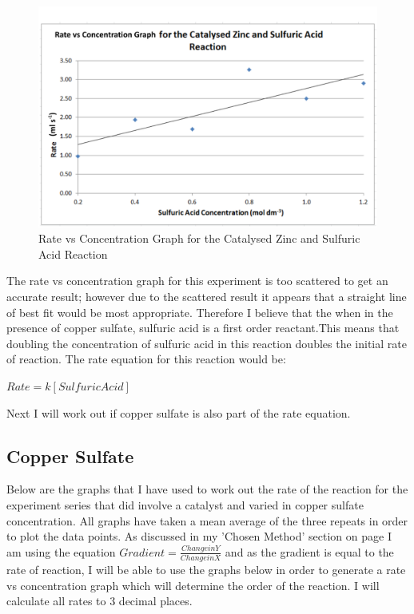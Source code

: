 \begin{figure}[H]
    \includegraphics[width=\textwidth]{./Analysis/Images/2Catalysed/ProgressGraph.pdf}
    \caption{Rate vs Concentration Graph for the Catalysed Zinc and Sulfuric Acid Reaction} \label{fig:ProgressGraphSACS}
\end{figure}

The rate vs concentration graph for this experiment is too scattered to get an accurate result; however due to the scattered result it appears that a straight line of best fit would be most appropriate. Therefore I believe that the when in the presence of copper sulfate, sulfuric acid is a first order reactant.This means that doubling the concentration of sulfuric acid in this reaction doubles the initial rate of reaction. The rate equation for this reaction would be:

$Rate = k [Sulfuric Acid]$

Next I will work out if copper sulfate is also part of the rate equation.

	\subsection{Copper Sulfate}
Below are the graphs that I have used to work out the rate of the reaction for the experiment series that did involve a catalyst and varied in copper sulfate concentration. All graphs have taken a mean average of the three repeats in order to plot the data points. As discussed in my 'Chosen Method' section on page \pageref{Chosen Method} I am using the equation $Gradient = \frac{Change in Y}{Change in X}$ and as the gradient is equal to the rate of reaction, I will be able to use the graphs below in order to generate a rate vs concentration graph which will determine the order of the reaction. I will calculate all rates to 3 decimal places.


